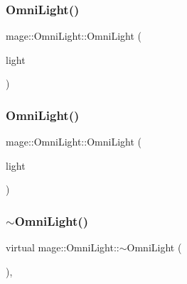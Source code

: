 \subsubsection{\texorpdfstring{Omni\+Light()}{OmniLight()}\hspace{0.1cm}{\footnotesize\ttfamily [2/3]}}
{\footnotesize\ttfamily mage\+::\+Omni\+Light\+::\+Omni\+Light (\begin{DoxyParamCaption}\item[{const \hyperlink{classmage_1_1_omni_light}{Omni\+Light} \&}]{light }\end{DoxyParamCaption})\hspace{0.3cm}{\ttfamily [default]}}

\hypertarget{classmage_1_1_omni_light_ae844308b4199f9c75c38512e8d8ad5e7}{}\label{classmage_1_1_omni_light_ae844308b4199f9c75c38512e8d8ad5e7} 
\subsubsection{\texorpdfstring{Omni\+Light()}{OmniLight()}\hspace{0.1cm}{\footnotesize\ttfamily [3/3]}}
{\footnotesize\ttfamily mage\+::\+Omni\+Light\+::\+Omni\+Light (\begin{DoxyParamCaption}\item[{\hyperlink{classmage_1_1_omni_light}{Omni\+Light} \&\&}]{light }\end{DoxyParamCaption})\hspace{0.3cm}{\ttfamily [default]}}

\hypertarget{classmage_1_1_omni_light_a9a741cc7e5e11d386c7a032df2d231a3}{}\label{classmage_1_1_omni_light_a9a741cc7e5e11d386c7a032df2d231a3} 
\subsubsection{\texorpdfstring{$\sim$\+Omni\+Light()}{~OmniLight()}}
{\footnotesize\ttfamily virtual mage\+::\+Omni\+Light\+::$\sim$\+Omni\+Light (\begin{DoxyParamCaption}{ }\end{DoxyParamCaption})\hspace{0.3cm}{\ttfamily [virtual]}, {\ttfamily [default]}}



